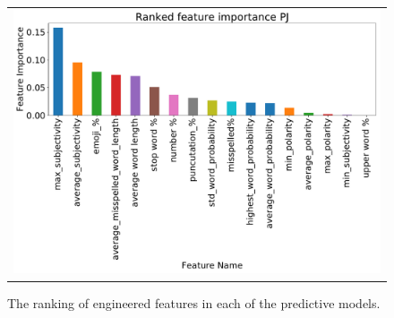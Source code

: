 \documentclass[sigconf, nonacm]{acmart}
\begin{document}
\begin{figure}
\begin{tabular}{c}
\includegraphics[width = 0.9\columnwidth]{PJ.pdf}
\end{tabular}
\caption{The ranking of engineered features in each of the predictive models. }
\label{feature_importance}
\end{figure}
\end{document}
